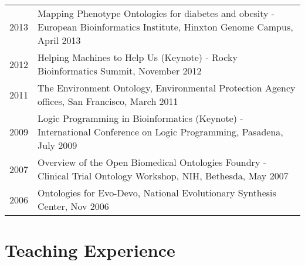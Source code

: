 \documentclass[11pt,fullpage]{article}
\begin{document}
\begin{longtable}{p{0.5in}|p{5.5in}}
 2013 & Mapping Phenotype Ontologies for diabetes and obesity - European Bioinformatics Institute, 
 Hinxton Genome Campus, April 2013\\

 2012 & Helping Machines to Help Us (Keynote) - Rocky Bioinformatics
 Summit, November 2012\\

 2011 & The Environment Ontology, Environmental Protection Agency offices, San Francisco, March 2011 \\

 2009 & Logic Programming in Bioinformatics (Keynote) - International
 Conference on Logic Programming, Pasadena, July 2009 \\

 2007 & Overview of the Open Biomedical Ontologies Foundry - Clinical Trial Ontology Workshop, NIH, Bethesda, May 2007 \\

 2006 & Ontologies for Evo-Devo, National Evolutionary Synthesis Center, Nov 2006 \\


\end{longtable}




\section*{Teaching Experience}
\end{document}
